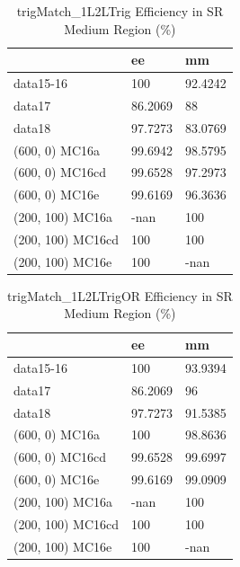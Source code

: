 \begin{table}
\begin{center}
\caption{trigMatch\_1L2LTrig Efficiency in SR Medium Region (\%)}
\begin{tabular}{l|l|l}
& ee & mm \\
\hline
data15-16 & 100 & 92.4242 \\
data17 & 86.2069 & 88 \\
data18 & 97.7273 & 83.0769 \\
(600, 0) MC16a & 99.6942 & 98.5795 \\
(600, 0) MC16cd & 99.6528 & 97.2973 \\
(600, 0) MC16e & 99.6169 & 96.3636 \\
(200, 100) MC16a & -nan & 100 \\
(200, 100) MC16cd & 100 & 100 \\
(200, 100) MC16e & 100 & -nan \\
\end{tabular}
\end{center}
\end{table}

\begin{table}
\begin{center}
\caption{trigMatch\_1L2LTrigOR Efficiency in SR Medium Region (\%)}
\begin{tabular}{l|l|l}
& ee & mm \\
\hline
data15-16 & 100 & 93.9394 \\
data17 & 86.2069 & 96 \\
data18 & 97.7273 & 91.5385 \\
(600, 0) MC16a & 100 & 98.8636 \\
(600, 0) MC16cd & 99.6528 & 99.6997 \\
(600, 0) MC16e & 99.6169 & 99.0909 \\
(200, 100) MC16a & -nan & 100 \\
(200, 100) MC16cd & 100 & 100 \\
(200, 100) MC16e & 100 & -nan \\
\end{tabular}
\end{center}
\end{table}

